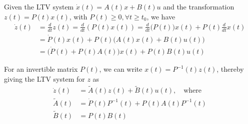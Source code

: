 Given the LTV system \( \dot{x}(t)=A(t) x+B(t) u \) and the transformation \( z(t)=P(t) x(t) \), with \( P(t) \geq 0, \forall t \geq t_{0} \), we have
\begin{align*}
    \dot{z}(t)
     & =
    \frac{d}{dt} z(t)
    =
    \frac{d}{dt} (P(t) x(t))
    =
    \frac{d}{dt} \Big(P(t)\Big) x(t) + P(t) \frac{d}{dt} x(t)
    \\
     & =
    \dot{P}(t) x(t) + P(t) \Big( A(t) x(t) + B(t) u(t) \Big)
    \\ & =
    \Big( \dot{P}(t) + P(t) A(t) \Big) x(t) + P(t) B(t) u(t)
\end{align*}

For an invertible matrix \( P(t) \), we can write \( x(t) = P^{-1}(t) z(t) \), thereby giving the LTV system for \( z \) as
\[
    \boxed{
        \begin{aligned}
            \dot{z}(t)
             & =
            \tilde{A}(t) z(t) + \tilde{B}(t) u(t), \quad \text{where}
            \\
            \tilde{A}(t)
             & =
            \dot{P}(t) P^{-1}(t) + P(t) A(t) P^{-1}(t)
            \\
            \tilde{B}(t)
             & =
            P(t) B(t)
        \end{aligned}
    }
\]
